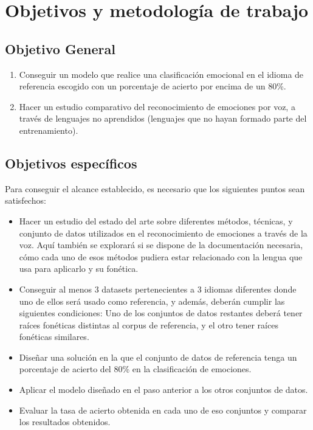 \documentclass[11pt,a4paper,spanish]{book}
\begin{document}
	
	\chapter{Objetivos y metodología de trabajo}
		
	\section{Objetivo General}
	
	\begin{enumerate}
		\item Conseguir un modelo que realice una clasificación emocional en el idioma de referencia escogido con un porcentaje de acierto por encima de un 80\%.
		\item Hacer un estudio comparativo del reconocimiento de emociones por voz, a través de lenguajes no aprendidos (lenguajes que no hayan formado parte del entrenamiento).
	\end{enumerate} 

	\section{Objetivos específicos}
	Para conseguir el alcance establecido, es necesario que los siguientes puntos sean satisfechos:
	\begin{itemize}
		\item Hacer un estudio del estado del arte sobre diferentes métodos, técnicas, y conjunto de datos utilizados en el reconocimiento de emociones a través de la voz. Aquí también se explorará si se dispone de la documentación necesaria, cómo cada uno de esos métodos pudiera estar relacionado con la lengua que usa para aplicarlo y su fonética.
		
		\item  Conseguir al menos 3 datasets pertenecientes a 3 idiomas diferentes donde uno de ellos será usado como referencia, y además, deberán cumplir las siguientes condiciones: Uno de los conjuntos de datos restantes deberá tener raíces fonéticas distintas al corpus de referencia, y el otro tener raíces fonéticas similares.
		
		\item Diseñar una solución en la que el conjunto de datos de referencia tenga un porcentaje de acierto del 80\% en la clasificación de emociones.
		
		\item Aplicar el modelo diseñado en el paso anterior a los otros conjuntos de datos.
		
		\item Evaluar la tasa de acierto obtenida en cada uno de eso conjuntos y comparar los resultados obtenidos.
		
	\end{itemize}
\end{document}
